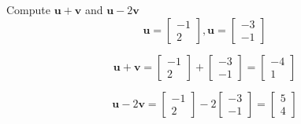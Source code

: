 \documentclass{mathhomework}
\newcommand{\Vect}[1]{\pmb{#1}}
\begin{document}
\pagebreak
\begin{problem}[1.3\#1]
    Compute $\Vect{u} + \Vect{v}$ and $\Vect{u} - 2\Vect{v}$
    \begin{equation*}
        \Vect{u} = \begin{bmatrix}
            -1 \\ 2
        \end{bmatrix}, \Vect{u} = \begin{bmatrix}
            -3 \\ -1
        \end{bmatrix}
    \end{equation*}

    \begin{solution}
        \begin{equation*}
            \Vect{u} + \Vect{v} = \begin{bmatrix}
                -1 \\ 2
            \end{bmatrix} + \begin{bmatrix}
                -3 \\ -1
            \end{bmatrix} = \begin{bmatrix}
                -4 \\ 1
            \end{bmatrix}
        \end{equation*}

        \begin{equation*}
            \Vect{u} - 2\Vect{v} = \begin{bmatrix}
                -1 \\ 2
            \end{bmatrix} - 2\begin{bmatrix}
                -3 \\ -1
            \end{bmatrix} = \begin{bmatrix}
                5 \\ 4
            \end{bmatrix}
        \end{equation*}
    \end{solution}
\end{problem}
\end{document}
